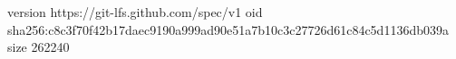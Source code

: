 version https://git-lfs.github.com/spec/v1
oid sha256:c8c3f70f42b17daec9190a999ad90e51a7b10c3c27726d61c84c5d1136db039a
size 262240
